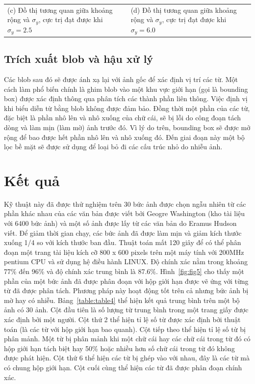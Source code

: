 \documentclass[a4paper]{article}
\begin{document}
\begin{table}
\begin{tabular}{MM}
(c) Đồ thị tương quan giữa khoảng rộng và $\sigma_y$, cực trị đạt được khi $\sigma_y = 2.5$ & (d) Đồ thị tương quan giữa khoảng rộng và $\sigma_y$, cực trị đạt được khi $\sigma_y = 6.0$
\end{tabular}
\label{fig:fig4}
\end{table}

\subsection{Trích xuất blob và hậu xử lý}
Các blob sau đó sẽ được ánh xạ lại với ảnh gốc để xác định vị trí các từ. Một cách làm phổ biến chính là ghim blob vào một khu vực giới hạn (gọi là bounding box) được xác định thông qua phân tích các thành phần liên thông. Việc định vị khi biểu diễn từ bằng blob không được đảm bảo. Đồng thời một phần của các từ, đặc biệt là phần nhô lên và nhô xuống của chữ cái, sẽ bị lỗi do công đoạn tách dòng và làm mịn (làm mờ) ảnh trước đó. Vì lý do trên, bounding box sẽ được mở rộng để bao được hết phần nhô lên và nhô xuống đó. Đến giai đoạn này một bộ lọc bề mặt sẽ được sử dụng để loại bỏ đi các cấu trúc nhỏ do nhiễu ảnh.

\section{Kết quả}
Kỹ thuật này đã được thử nghiệm trên 30 bức ảnh được chọn ngẫu nhiên từ các phần khác nhau của các văn bản được viết bởi Geogre Washington (kho tài liệu với 6400 bức ảnh) và một số ảnh được lấy từ các văn bản do Eramus Hudson viết. Để giảm thời gian chạy, các bức ảnh đã được làm mịn và giảm kích thước xuống 1/4 so với kích thước ban đầu. Thuật toán mất 120 giây để có thể phân đoạn một trang tài liệu kích cỡ 800 x 600 pixels trên một máy tính với 200MHz pentium CPU và sử dụng hệ điều hành LINUX. Độ chính xác nằm trong khoảng 77\% đến 96\% và độ chính xác trung bình là 87.6\%. Hình~\ref{fig:fig5} cho thấy một phần của một bức ảnh đã được phân đoạn với hộp giới hạn được vẽ ứng với từng từ đã được phân tách. Phương pháp này hoạt động tốt trên cả nhưng bức ảnh bị mờ hay có nhiễu. Bảng~\ref{table:table4} thể hiện kết quả trung bình trên một bộ ảnh có 30 ảnh. Cột đầu tiên là số lượng từ trung bình trong một trang giấy được xác định bởi một người. Cột thứ 2 thể hiện tỉ lệ số từ được xác định bởi thuật toán (là các từ với hộp giới hạn bao quanh). Cột tiếp theo thể hiện tỉ lệ số từ bị phân mảnh. Một từ bị phân mảnh khi một chữ cái hay các chữ cái trong từ đó có hộp giới hạn tách biệt hay 50\% hoặc nhiều hơn số chữ cái trong từ đó không được phát hiện. Cột thứ 6 thể hiện các từ bị ghép vào với nhau, đây là các từ mà có chung hộp giới hạn. Cột cuối cùng thể hiện các từ đã được phân đoạn chính xác.
\end{document}
